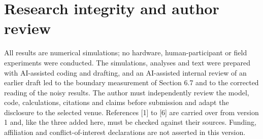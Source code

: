 \documentclass[11pt,a4paper]{article}
\begin{document}
\section*{Research integrity and author review}
All results are numerical simulations; no hardware, human-participant or field experiments were conducted. The simulations, analyses and text were prepared with AI-assisted coding and drafting, and an AI-assisted internal review of an earlier draft led to the boundary measurement of Section 6.7 and to the corrected reading of the noisy results. The author must independently review the model, code, calculations, citations and claims before submission and adapt the disclosure to the selected venue. References [1] to [6] are carried over from version 1 and, like the three added here, must be checked against their sources. Funding, affiliation and conflict-of-interest declarations are not asserted in this version.
\end{document}
